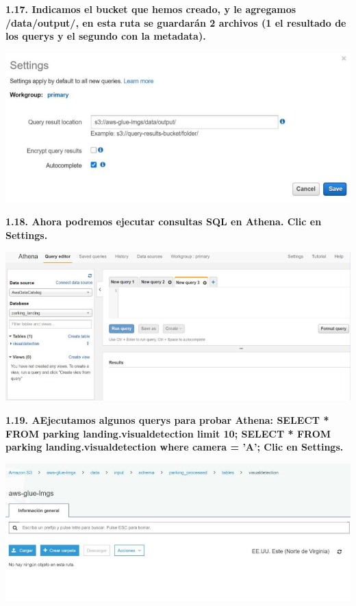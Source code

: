 \documentclass{article}
\begin{document}
	
		\textbf{1.17.  Indicamos el bucket que hemos creado, y le agregamos /data/output/, en esta ruta se guardarán 2
archivos (1 el resultado de los querys y el segundo con la metadata).
}

    \begin{center}
		\includegraphics[width=15cm]{./images/18} 
	\end{center}
	
	
	
		\textbf{1.18. Ahora podremos ejecutar consultas SQL en Athena. 
Clic en Settings.
}

    \begin{center}
		\includegraphics[width=15cm]{./images/19} 
	\end{center}
	
	
		\textbf{1.19.  AEjecutamos algunos querys para probar Athena:
SELECT * FROM parking landing.visualdetection limit 10;
SELECT * FROM parking landing.visualdetection where camera = 'A';
Clic en Settings.
}

    \begin{center}
		\includegraphics[width=15cm]{./images/20} 
	\end{center}
	
\end{document}
